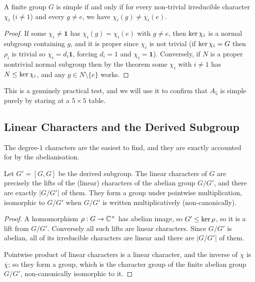 \documentclass[a4paper]{scrartcl}
\begin{document}
\begin{corollary}
	A finite group $G$ is simple if and only if for every non-trivial irreducible character $\chi_i$ ($i \neq 1$) and every $g \neq e$, we have $\chi_i(g) \neq \chi_i(e)$.
\end{corollary}
\begin{proof}
	If some $\chi_i \neq \mathbf 1$ has $\chi_i(g) = \chi_i(e)$ with $g \neq e$, then $\operatorname{ker}\chi_i$ is a normal subgroup containing $g$, and it is proper since $\chi_i$ is not trivial (if $\operatorname{ker}\chi_i = G$ then $\rho_i$ is trivial so $\chi_i = d_i\mathbf 1$, forcing $d_i=1$ and $\chi_i = \mathbf 1$). Conversely, if $N$ is a proper nontrivial normal subgroup then by the theorem some $\chi_i$ with $i \neq 1$ has $N \leq \operatorname{ker} \chi_i$, and any $g \in N\setminus\{e\}$ works.
\end{proof}

This is a genuinely practical test, and we will use it to confirm that $A_5$ is simple purely by staring at a $5\times5$ table.

\subsection{Linear Characters and the Derived Subgroup}

The degree-$1$ characters are the easiest to find, and they are exactly accounted for by the abelianisation.

\begin{proposition}
	Let $G' = [G,G]$ be the derived subgroup. The linear characters of $G$ are precisely the lifts of the (linear) characters of the abelian group $G/G'$, and there are exactly $|G/G'|$ of them. They form a group under pointwise multiplication, isomorphic to $G/G'$ when $G/G'$ is written multiplicatively (non-canonically).
\end{proposition}
\begin{proof}
	A homomorphism $\rho : G \to \mathbb{C}^\times$ has abelian image, so $G' \leq \operatorname{ker}\rho$, so it is a lift from $G/G'$. Conversely all such lifts are linear characters. Since $G/G'$ is abelian, all of its irreducible characters are linear and there are $|G/G'|$ of them.

	Pointwise product of linear characters is a linear character, and the inverse of $\chi$ is $\overline\chi$; so they form a group, which is the character group of the finite abelian group $G/G'$, non-canonically isomorphic to it.
\end{proof}
\end{document}
